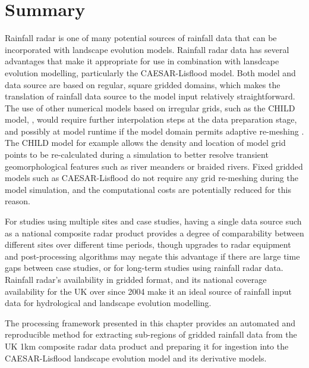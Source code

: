 \section{Summary}
Rainfall radar is one of many potential sources of rainfall data that can be incorporated with landscape evolution models. Rainfall radar data has several advantages that make it appropriate for use in combination with lansdcape evolution modelling, particularly the CAESAR-Lisflood model. Both model and data source are based on regular, square gridded domains, which makes the translation of rainfall data source to the model input relatively straightforward. The use of other numerical models based on irregular grids, such as the CHILD model,  \citep{Tucker2001}, would require further interpolation steps at the data preparation stage, and possibly at model runtime if the model domain permits adaptive re-meshing \citep{clevis2006simple, tucker2001child}. The CHILD model for example allows the density and location of model grid points to be re-calculated during a simulation to better resolve transient geomorphological features such as river meanders or braided rivers. Fixed gridded models such as CAESAR-Lisflood do not require any grid re-meshing during the model simulation, and the computational costs are potentially reduced for this reason.

For studies using multiple sites and case studies, having a single data source such as a national composite radar product provides a degree of comparability between different sites over different time periods, though upgrades to radar equipment and post-processing algorithms \citep[e.g.][]{harrison2012radar} may negate this advantage if there are large time gaps between case studies, or for long-term studies using rainfall radar data. Rainfall radar's availability in gridded format, and its national coverage availability for the UK over since 2004 make it an ideal source of rainfall input data for hydrological and landscape evolution modelling. 

The processing framework presented in this chapter provides an automated and reproducible method for extracting sub-regions of gridded rainfall data from the UK 1km composite radar data product and preparing it for ingestion into the CAESAR-Lisflood landscape evolution model and its derivative models.



